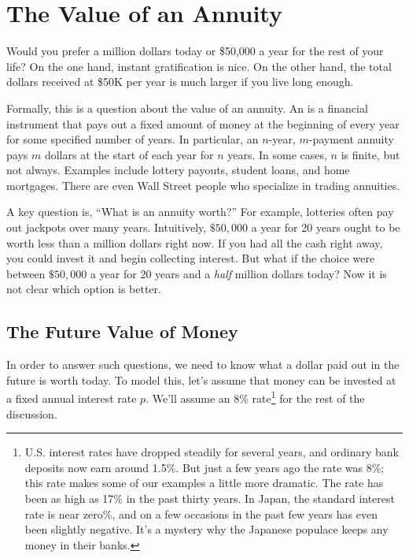 \section{The Value of an Annuity}\label{annuity_sec}

Would you prefer a million dollars today or \$50,000 a year for the
rest of your life?  On the one hand, instant gratification is nice.
On the other hand, the total dollars received at \$50K per year is
much larger if you live long enough.

Formally, this is a question about the value of an annuity.  An
 is a financial instrument that pays out a fixed amount of
money at the beginning of every year for some specified number of years.
In particular, an $n$-year, $m$-payment annuity pays $m$ dollars at the
start of each year for $n$ years.  In some cases, $n$ is finite, but not
always.  Examples include lottery payouts, student loans, and home
mortgages.  There are even Wall Street people who specialize in trading
annuities.

A key question is, ``What is an annuity worth?''  For example,
lotteries often pay out jackpots over many years.  Intuitively,
$\$50,000$ a year for 20 years ought to be worth less than a million
dollars right now.  If you had all the cash right away, you could
invest it and begin collecting interest.  But what if the choice were
between $\$50,000$ a year for 20 years and a \emph{half} million
dollars today?  Now it is not clear which option is better.

\subsection{The Future Value of Money}

In order to answer such questions, we need to know what a dollar paid out
in the future is worth today.  To model this, let's assume that money can
be invested at a fixed annual interest rate $p$.  We'll assume an 8\%
rate\footnote{U.S. interest rates have dropped steadily for several years,
  and ordinary bank deposits now earn around 1.5\%.  But just a few years
  ago the rate was 8\%; this rate makes some of our examples a little more
  dramatic.  The rate has been as high as 17\% in the past thirty
  years. In Japan, the standard interest rate is near zero\%, and on a few
  occasions in the past few years has even been slightly negative.  It's a
  mystery why the Japanese populace keeps any money in their banks.}  for
the rest of the discussion.

